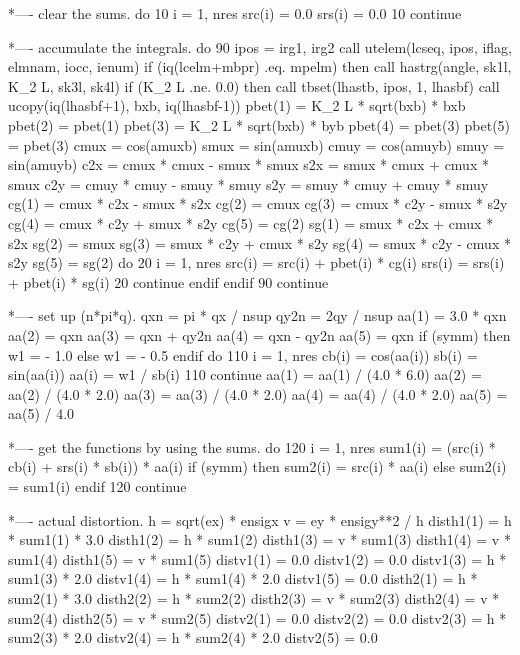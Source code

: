 *---- clear the sums.
      do 10 i = 1, nres
        src(i) = 0.0
        srs(i) = 0.0
   10 continue
 
*---- accumulate the integrals.
      do 90 ipos = irg1, irg2
        call utelem(lcseq, ipos, iflag, elmnam, iocc, ienum)
        if (iq(lcelm+mbpr) .eq. mpelm) then
          call hastrg(angle, sk1l, K_2 L, sk3l, sk4l)
          if (K_2 L .ne. 0.0) then
            call tbset(lhastb, ipos, 1, lhasbf)
            call ucopy(iq(lhasbf+1), bxb, iq(lhasbf-1))
            pbet(1) = K_2 L * sqrt(bxb) * bxb
            pbet(2) = pbet(1)
            pbet(3) = K_2 L * sqrt(bxb) * byb
            pbet(4) = pbet(3)
            pbet(5) = pbet(3)
            cmux = cos(amuxb)
            smux = sin(amuxb)
            cmuy = cos(amuyb)
            smuy = sin(amuyb)
            c2x = cmux * cmux - smux * smux
            s2x = smux * cmux + cmux * smux
            c2y = cmuy * cmuy - smuy * smuy
            s2y = smuy * cmuy + cmuy * smuy
            cg(1) = cmux * c2x - smux * s2x
            cg(2) = cmux
            cg(3) = cmux * c2y - smux * s2y
            cg(4) = cmux * c2y + smux * s2y
            cg(5) = cg(2)
            sg(1) = smux * c2x + cmux * s2x
            sg(2) = smux
            sg(3) = smux * c2y + cmux * s2y
            sg(4) = smux * c2y - cmux * s2y
            sg(5) = sg(2)
            do 20 i = 1, nres
              src(i) = src(i) + pbet(i) * cg(i)
              srs(i) = srs(i) + pbet(i) * sg(i)
   20       continue
          endif
        endif
   90 continue
 
*---- set up (n*pi*q).
      qxn = pi * qx / nsup
      qy2n = 2\pi * qy / nsup
      aa(1) = 3.0 * qxn
      aa(2) = qxn
      aa(3) = qxn + qy2n
      aa(4) = qxn - qy2n
      aa(5) = qxn
      if (symm) then
        w1 = - 1.0
      else
        w1 = - 0.5
      endif
      do 110 i = 1, nres
        cb(i) = cos(aa(i))
        sb(i) = sin(aa(i))
        aa(i) = w1 / sb(i)
  110 continue
      aa(1) = aa(1) / (4.0 * 6.0)
      aa(2) = aa(2) / (4.0 * 2.0)
      aa(3) = aa(3) / (4.0 * 2.0)
      aa(4) = aa(4) / (4.0 * 2.0)
      aa(5) = aa(5) / 4.0
 
*---- get the functions by using the sums.
      do 120 i = 1, nres
        sum1(i) = (src(i) * cb(i) + srs(i) * sb(i)) * aa(i)
        if (symm) then
          sum2(i) = src(i) * aa(i)
        else
          sum2(i) = sum1(i)
        endif
  120 continue
 
*---- actual distortion.
      h = sqrt(ex) * ensigx
      v = ey * ensigy**2 / h
      disth1(1) = h * sum1(1) * 3.0
      disth1(2) = h * sum1(2)
      disth1(3) = v * sum1(3)
      disth1(4) = v * sum1(4)
      disth1(5) = v * sum1(5)
      distv1(1) = 0.0
      distv1(2) = 0.0
      distv1(3) = h * sum1(3) * 2.0
      distv1(4) = h * sum1(4) * 2.0
      distv1(5) = 0.0
      disth2(1) = h * sum2(1) * 3.0
      disth2(2) = h * sum2(2)
      disth2(3) = v * sum2(3)
      disth2(4) = v * sum2(4)
      disth2(5) = v * sum2(5)
      distv2(1) = 0.0
      distv2(2) = 0.0
      distv2(3) = h * sum2(3) * 2.0
      distv2(4) = h * sum2(4) * 2.0
      distv2(5) = 0.0
 
